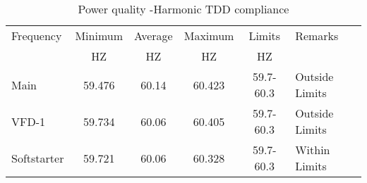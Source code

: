 \begin{table}[!htb]
	\caption{Power quality -Harmonic TDD compliance}
	\label{tbl_ch04_elecaudit_powerquality_frequency}
	{\scriptsize
\begin{tabular}{l|l|l|l|l|l}
	\hline
	Frequency & \multicolumn{1}{c|}{Minimum} & \multicolumn{1}{c|}{Average} & \multicolumn{1}{c|}{Maximum} & \multicolumn{1}{c|}{Limits} & Remarks \\ 
	& \multicolumn{1}{c|}{HZ} & \multicolumn{1}{c|}{HZ} & \multicolumn{1}{c|}{HZ} & \multicolumn{1}{c|}{HZ} &  \\ 
	\hline
	Main  & \multicolumn{1}{c|}{59.476} & \multicolumn{1}{c|}{60.14} & \multicolumn{1}{c|}{60.423} & \multicolumn{1}{c|}{59.7-60.3} & Outside  Limits \\ 
	\hline
	VFD-1 & \multicolumn{1}{c|}{59.734} & \multicolumn{1}{c|}{60.06} & \multicolumn{1}{c|}{60.405} & \multicolumn{1}{c|}{59.7-60.3} & Outside  Limits \\ 
	\hline
	Softstarter & \multicolumn{1}{c|}{59.721} & \multicolumn{1}{c|}{60.06} & \multicolumn{1}{c|}{60.328} & \multicolumn{1}{c|}{59.7-60.3} & Within  Limits \\ 
	\hline
\end{tabular}
		
	}%
\end{table}